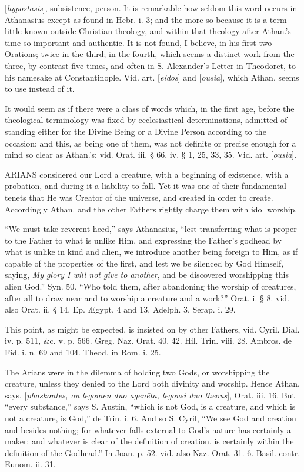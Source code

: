 
[\emph{hypostasis}], subsistence, person. It is
remarkable how seldom this word occurs in Athanasius except as found
in Hebr. i. 3; and the more so because it is a term little known
outside Christian theology, and within that theology after Athan.'s
time so important and authentic. It is not found, I believe, in his
first two Orations; twice in the third; in the fourth, which seems a
distinct work from the three, by contrast five times, and often in S.
Alexander's Letter in Theodoret, to his namesake at Constantinople.
Vid. art. [\emph{eidos}] and [\emph{ousia}], which Athan. seems to use
instead of it.

It would seem as if there were a class of words
which, in the first age, before the theological terminology was fixed
by ecclesiastical determinations, admitted of standing either for the
Divine Being or a Divine Person according to the occasion; and this,
as being one of them, was not definite or precise enough for a mind so
clear as Athan.'s; vid. Orat. iii. § 66, iv. § 1, 25, 33, 35. Vid.
art. [\emph{ousia}].


ARIANS
considered our Lord a creature, with a beginning of existence, with a
probation, and during it a liability to fall. Yet it was one of their
fundamental tenets that He was Creator of the universe, and created in
order to create. Accordingly Athan. and the other Fathers rightly
charge them with idol worship.

``We must take reverent heed,'' says Athanasius, ``lest transferring what is proper to the Father to what is unlike
Him, and expressing the Father's godhead by what is unlike in kind
and alien, we introduce another being foreign to Him, as if capable of
the properties of the first, and lest we be silenced by God Himself,
saying, \emph{My glory I will not give to another}, and be discovered
worshipping this alien God.'' Syn. 50. ``Who told them, after
abandoning the worship of creatures, after all to draw near and to
worship a creature and a work?'' Orat. i. § 8. vid. also Orat. ii.
§ 14. Ep. Ægypt. 4 and 13. Adelph. 3. Serap. i. 29.

This point, as might be expected, is insisted on
by other Fathers, vid. Cyril. Dial. iv. p. 511, \&c. v. p. 566.
Greg. Naz. Orat. 40. 42. Hil. Trin. viii. 28. Ambros. de Fid. i. n. 69
and 104. Theod. in Rom. i. 25.

The Arians were in the dilemma of holding two
Gods, or worshipping the creature, unless they denied to the Lord both
divinity and worship. Hence Athan. says, [\emph{phaskontes, ou
legomen duo agen\={e}ta, legousi duo theous}], Orat. iii. 16.
But ``every substance,'' says S. Austin, ``which is not God, is a
creature, and which is not a creature, is God,'' de Trin. i. 6. And
so S. Cyril, ``We see God and creation and besides nothing; for
whatever falls external to God's nature has certainly a maker; and
whatever is clear of the definition of creation, is certainly within
the definition of the Godhead.'' In Joan. p. 52. vid. also Naz. Orat.
31. 6. Basil. contr. Eunom. ii. 31.

